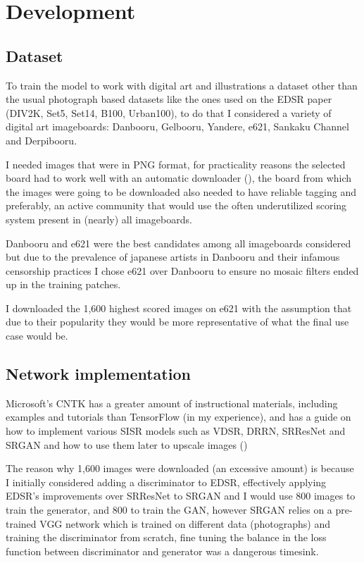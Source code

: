 \chapter{Development} %

\label{Chapter4}

\section{Dataset}

To train the model to work with digital art and illustrations a dataset other than the usual photograph based datasets like the ones used on the EDSR paper (DIV2K, Set5, Set14, B100, Urban100), to do that I considered a variety of digital art imageboards: Danbooru, Gelbooru, Yandere, e621, Sankaku Channel and Derpibooru.

\hfill

I needed images that were in PNG format, for practicality reasons the selected board had to work well with an automatic downloader (\cite{grabber}), the board from which the images were going to be downloaded also needed to have reliable tagging and preferably, an active community that would use the often underutilized scoring system present in (nearly) all imageboards.

\hfill

Danbooru and e621 were the best candidates among all imageboards considered but due to the prevalence of japanese artists in Danbooru and their infamous censorship practices I chose e621 over Danbooru to ensure no mosaic filters ended up in the training patches.

\hfill

I downloaded the 1,600 highest scored images on e621 with the assumption that due to their popularity they would be more representative of what the final use case would be.

\section{Network implementation}

Microsoft's CNTK has a greater amount of instructional materials, including examples and tutorials than TensorFlow (in my experience), and has a guide on how to implement various SISR models such as VDSR, DRRN, SRResNet and SRGAN and how to use them later to upscale images (\cite{cntk-tutorial})

\hfill

The reason why 1,600 images were downloaded (an excessive amount) is because I initially considered adding a discriminator to EDSR, effectively applying EDSR's improvements over SRResNet to SRGAN and I would use 800 images to train the generator, and 800 to train the GAN, however SRGAN relies on a pre-trained VGG network which is trained on different data (photographs) and training the discriminator from scratch, fine tuning the balance in the loss function between discriminator and generator was a dangerous timesink.

